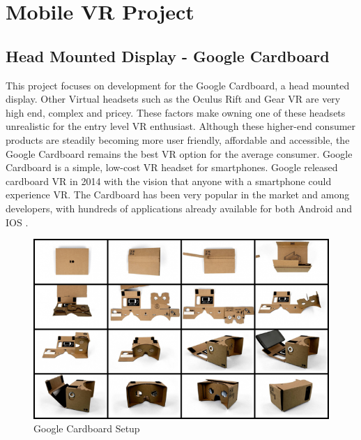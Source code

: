 \documentclass[12pt]{article}
\begin{document}
 \clearpage
 




\section{Mobile VR Project}

\subsection{Head Mounted Display - Google Cardboard}
This project focuses on development for the Google Cardboard, a head mounted display. Other Virtual headsets such as the Oculus Rift and Gear VR are very high end, complex and pricey. These factors make owning one of these headsets unrealistic for the entry level VR enthusiast. Although these higher-end consumer products are steadily becoming more user friendly, affordable and accessible, the Google Cardboard remains the best VR option for the average consumer. Google Cardboard is a simple, low-cost VR headset for smartphones. Google released cardboard VR in 2014 with the vision that anyone with a smartphone could experience VR. The Cardboard has been very popular in the market and among developers, with hundreds of applications already available for both Android and IOS \cite{parisi}.

 \begin{figure}[h]
    \centering
 \includegraphics[width=\textwidth]{picture14_cardboard}
  \caption{Google Cardboard Setup \cite{cardboard}}
  \label{fig:cardboard}
 \end{figure}
\end{document}
